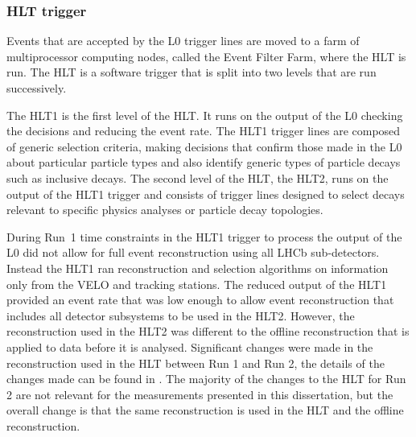 \subsubsection{HLT trigger}
\label{HLT}

Events that are accepted by the L0 trigger lines are moved to a farm of multiprocessor computing nodes, called the Event Filter Farm, where the HLT is run. The HLT is a software trigger that is split into two levels that are run successively. 

The HLT1 is the first level of the HLT. It runs on the output of the L0 checking the decisions and reducing the event rate. %
The HLT1 trigger lines are composed of generic selection criteria, making decisions that confirm those made in the L0 about particular particle types and also identify generic types of particle decays such as inclusive \bhadron decays. 
The second level of the HLT, the HLT2, runs on the output of the HLT1 trigger and consists of trigger lines designed to select decays relevant to specific physics analyses or particle decay topologies.




During Run~1 time constraints in the HLT1 trigger to process the output of the L0 did not allow for full event reconstruction using all LHCb sub-detectors. Instead the HLT1 ran reconstruction and selection algorithms on information only from the VELO and tracking stations. The reduced output of the HLT1 provided an event rate that was low enough to allow event reconstruction that includes all detector subsystems to be used in the HLT2. However, the reconstruction used in the HLT2 was different to the offline reconstruction that is applied to data before it is analysed. Significant changes were made in the reconstruction used in the HLT between Run 1 and Run 2, the details of the changes made can be found in \cite{Lupton:2230910}. The majority of the changes to the HLT for Run 2 are not relevant for the measurements presented in this dissertation, but the overall change is that the same reconstruction is used in the HLT and the offline reconstruction. 


